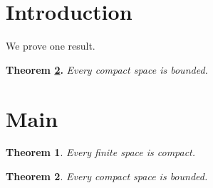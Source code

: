 \documentclass{article}
\newtheorem{theorem}{Theorem}[section]
\begin{document}
\section{Introduction}
We prove one result.

\noindent
{\bf Theorem \ref{thm:main}.} {\em Every compact space is bounded.}

\section{Main}
\begin{theorem}\label{thm:other} Every finite space is compact. \end{theorem}
\begin{theorem}\label{thm:main} Every compact space is bounded. \end{theorem}
\end{document}
